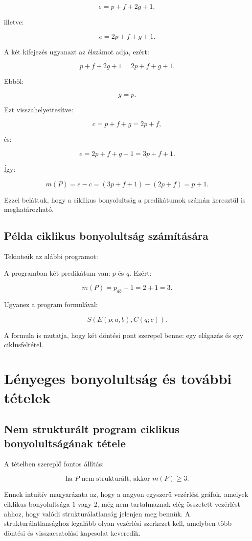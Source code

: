 \[
e=p+f+2g+1,
\]

illetve:

\[
e=2p+f+g+1.
\]

A két kifejezés ugyanazt az élszámot adja, ezért:

\[
p+f+2g+1=2p+f+g+1.
\]

Ebből:

\[
g=p.
\]

Ezt visszahelyettesítve:

\[
c=p+f+g=2p+f,
\]

és:

\[
e=2p+f+g+1=3p+f+1.
\]

Így:

\[
m(P)=e-c=(3p+f+1)-(2p+f)=p+1.
\]

Ezzel beláttuk, hogy a ciklikus bonyolultság a predikátumok számán keresztül is meghatározható.

\subsection{Példa ciklikus bonyolultság számítására}

Tekintsük az alábbi programot:


A programban két predikátum van: $p$ és $q$. Ezért:

\[
m(P)=p_{db}+1=2+1=3.
\]

Ugyanez a program formulával:

\[
S(E(p;a,b),C(q;c)).
\]

A formula is mutatja, hogy két döntési pont szerepel benne: egy elágazás és egy ciklusfeltétel.

\section{Lényeges bonyolultság és további tételek}

\subsection{Nem strukturált program ciklikus bonyolultságának tétele}

A tételben szereplő fontos állítás:

\[
\text{ha }P\text{ nem strukturált, akkor }m(P)\geq 3.
\]

Ennek intuitív magyarázata az, hogy a nagyon egyszerű vezérlési gráfok, amelyek ciklikus bonyolultsága $1$ vagy $2$, még nem tartalmaznak elég összetett vezérlést ahhoz, hogy valódi strukturálatlanság jelenjen meg bennük. A strukturálatlansághoz legalább olyan vezérlési szerkezet kell, amelyben több döntési és visszacsatolási kapcsolat keveredik.

